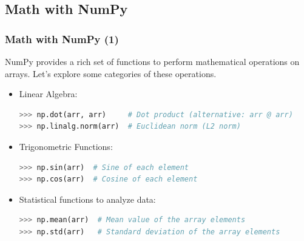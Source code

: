 \subsection{Math with NumPy}
\begin{frame}[fragile]
  \frametitle{Math with NumPy (1)}
  NumPy provides a rich set of functions to perform mathematical operations on arrays. Let's explore some categories of these operations.
  \begin{itemize}
    \item Linear Algebra:
    \begin{lstlisting}[language=Python, numbers=none]
>>> np.dot(arr, arr)     # Dot product (alternative: arr @ arr)
>>> np.linalg.norm(arr)  # Euclidean norm (L2 norm)
    \end{lstlisting}\pause
    
    \item Trigonometric Functions:
  \begin{lstlisting}[language=Python, numbers=none]
>>> np.sin(arr)  # Sine of each element
>>> np.cos(arr)  # Cosine of each element
  \end{lstlisting}
  
  \item Statistical functions to analyze data:
  \begin{lstlisting}[language=Python, numbers=none]
>>> np.mean(arr)  # Mean value of the array elements
>>> np.std(arr)   # Standard deviation of the array elements
  \end{lstlisting}\pause
\end{itemize}
\end{frame}


